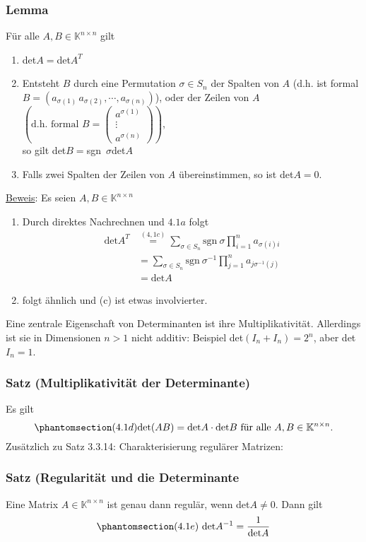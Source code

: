 \subsubsection{Lemma}
Für alle $A,B\in\mathbb{K}^{n\times n}$ gilt
\renewcommand{\labelenumi}{(\alph{enumi})}
\begin{enumerate}
\item det$A=$det$A^T$
\item Entsteht $B$ durch eine Permutation $\sigma \in S_n$ der Spalten von $A$ (d.h. ist formal $B=(a_{\sigma (1)}\,a_{\sigma (2)},\cdots ,a_{\sigma (n)})$), oder der Zeilen von $A$ $\left(\text{d.h. formal }B=\begin{pmatrix}a^{\sigma (1)}\\ \vdots \\ a^{\sigma (n)}\end{pmatrix}\right)$,\\
so gilt det$B=$sgn~$\sigma$det$A$
\item Falls zwei Spalten der Zeilen von $A$ übereinstimmen, so ist det$A=0$.
\end{enumerate}
\underline{Beweis}: Es seien $A,B\in\mathbb{K}^{n\times n}$
\begin{enumerate}
\item Durch direktes Nachrechnen und \hyperref[4.1a]{$4.1a$} folgt 
\begin{align*}
\mathrm{det}A^T&\stackrel{(4,1c)}{=}\sum _{\sigma\in S_n}\mathrm{sgn~}\sigma \prod _{i=1}^n a_{\sigma (i)i}\\
&=\sum _{\sigma \in S_n} \mathrm{sgn~}\sigma ^{-1}\prod _{j=1}^n a_{j\sigma ^{-1}(j)}\\
&= \mathrm{det}A
\end{align*}
\item folgt ähnlich und (c) ist etwas involvierter.
\end{enumerate}
Eine zentrale Eigenschaft von Determinanten ist ihre Multiplikativität.  Allerdings ist sie in Dimensionen $n>1$ nicht additiv: Beispiel det$(I_n+I_n)=2^n$, aber det$I_n=1$.
\subsubsection{Satz (Multiplikativität der Determinante)}
\label{4.1.10}
Es gilt \[\phantomsection\label{4.1d}(4.1d)\mathrm{det}(AB)=\mathrm{det}A\cdot\mathrm{det}B\text{ für alle }A,B\in\mathbb{K}^{n\times n}.\]
Zusätzlich zu Satz 3.3.14: Charakterisierung regulärer Matrizen: 
\subsubsection{Satz (Regularität und die Determinante}
\label{4.1.11}
Eine Matrix $A\in\mathbb{K}^{n\times n}$ ist genau dann regulär, wenn det$A\not= 0$.  Dann gilt
\[\phantomsection\label{4.1e}(4.1e)\ \mathrm{det}A^{-1}=\frac{1}{\mathrm{det}A}\]
